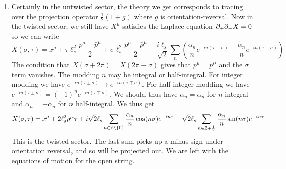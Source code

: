 \documentclass[11pt, class=article, crop=false]{standalone}
\begin{document}
\begin{enumerate}
	All of the terms in \eqref{eq:Rtype1} will transform under parity twice as as $\epsilon_R^2 \mathcal A (\gamma {\gamma^T}^{-1})_{ii'} \ket{S_\alpha; a'b'} (\gamma^T {\gamma}^{-1})_{j'j}$. We will have the same $\gamma$ matrix as in the NS sector, as required for consistency of interactions. Here, though, we will get $\epsilon_R = -1 \Rightarrow \epsilon_R^2 = 1$ and we will get $\lambda = \gamma \lambda^T \gamma^{-1}$ (this is what we got from the massless sector with an extra minus sign since $\psi_{-1}, \alpha_{-1}$ now transform with minus signs). Again we will have that these states will transform in the symmetric representation of $\SO(32)$. 

	Again we get $128$ bosonic states that will transform as the $\mathbf{44} \oplus \mathbf{84}$ representation of $\SO(9)$. We will also get fermions transforming in the $\mathbf{128}$ spinor representation as in exercise \textbf{3}. 
	All of these states will transform in the traceless symmetric representation of $\SO(32)$. \textbf{Confirm}
	
	
	\item Certainly in the untwisted sector, the theory we get corresponds to tracing over the projection operator $\frac12 (1 + g)$ where $g$ is orientation-reversal. Now in the twisted sector, we still have $X^\mu$ satisfies the Laplace equation $\partial_+ \partial_- X = 0$ so we can write
	\[
		X(\sigma, \tau) = x^\mu + \tau \ell_s^2 \frac{p^\mu + \bar p^\mu}{2} + \sigma \ell_s^2 \frac{p^\mu - \bar p^\mu}{2} + \frac{i \ell_s}{\sqrt 2} \sum_{n} \left( \frac{\alpha_n}{n} e^{-i n (\tau  + \sigma)} + \frac{\tilde \alpha_n}{n} e^{-i n (\tau  - \sigma)} \right)
	\]
	The condition that $X(\sigma + 2\pi) = X(2\pi-\sigma)$ gives that $p^\mu = \bar p^\mu$ and the $\sigma$ term vanishes. The modding $n$ may be integral or half-integral. For integer modding we have $e^{-i n (\tau \pm \sigma)} \to e^{-i n (\tau \mp \sigma)}$. For half-integer modding we have $e^{-i n (\tau \pm \sigma)} = (-1)^n e^{-i n (\tau \mp \sigma)}$. We should thus have $\alpha_n = \tilde \alpha_n$ for $n$ integral and $\alpha_{n} = -\tilde \alpha_{n}$ for $n$ half-integral. We thus get
	\[
			X(\sigma, \tau) = x^\mu + 2 \ell_s^2 p^\mu \tau + i \sqrt 2\ell_s \sum_{n \in \mathbb{Z} \setminus \{0\}} \frac{\alpha_n}{n} \cos(n \sigma) e^{- i n \tau}  - \sqrt{2} \ell_s \sum_{n \in \mathbb{Z} + \frac12} \frac{\alpha_n}{n} \sin(n \sigma) e^{-i n \tau}
	\]
	This is the twisted sector. The last sum picks up a minus sign under orientation reversal, and so will be projected out. We are left with the equations of motion for the open string.
	

\end{enumerate}
\end{document}

